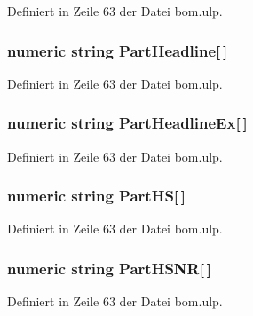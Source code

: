 Definiert in Zeile 63 der Datei bom.\+ulp.

\hypertarget{bom_8ulp_a2109cabfeb535fe6bff12bf1fb092acd}{}
\subsubsection[{Part\+Headline}]{\setlength{\rightskip}{0pt plus 5cm}numeric string Part\+Headline\mbox{[}$\,$\mbox{]}}\label{bom_8ulp_a2109cabfeb535fe6bff12bf1fb092acd}


Definiert in Zeile 63 der Datei bom.\+ulp.

\hypertarget{bom_8ulp_af34f3cdce145b7088430ab4561161595}{}
\subsubsection[{Part\+Headline\+Ex}]{\setlength{\rightskip}{0pt plus 5cm}numeric string Part\+Headline\+Ex\mbox{[}$\,$\mbox{]}}\label{bom_8ulp_af34f3cdce145b7088430ab4561161595}


Definiert in Zeile 63 der Datei bom.\+ulp.

\hypertarget{bom_8ulp_aae53009645b43fc7d8ea395c21848537}{}
\subsubsection[{Part\+H\+S}]{\setlength{\rightskip}{0pt plus 5cm}numeric string Part\+H\+S\mbox{[}$\,$\mbox{]}}\label{bom_8ulp_aae53009645b43fc7d8ea395c21848537}


Definiert in Zeile 63 der Datei bom.\+ulp.

\hypertarget{bom_8ulp_aab5d6a1ef82f71bd599529f5c7a4c496}{}
\subsubsection[{Part\+H\+S\+N\+R}]{\setlength{\rightskip}{0pt plus 5cm}numeric string Part\+H\+S\+N\+R\mbox{[}$\,$\mbox{]}}\label{bom_8ulp_aab5d6a1ef82f71bd599529f5c7a4c496}


Definiert in Zeile 63 der Datei bom.\+ulp.

